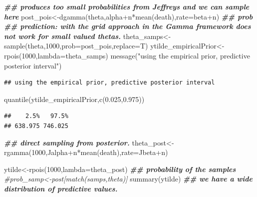\documentclass[
]{book}
\newenvironment{Shaded}{\begin{snugshade}}{\end{snugshade}}
\newcommand{\AttributeTok}[1]{\textcolor[rgb]{0.77,0.63,0.00}{#1}}
\newcommand{\CommentTok}[1]{\textcolor[rgb]{0.56,0.35,0.01}{\textit{#1}}}
\newcommand{\DecValTok}[1]{\textcolor[rgb]{0.00,0.00,0.81}{#1}}
\newcommand{\DocumentationTok}[1]{\textcolor[rgb]{0.56,0.35,0.01}{\textbf{\textit{#1}}}}
\newcommand{\FloatTok}[1]{\textcolor[rgb]{0.00,0.00,0.81}{#1}}
\newcommand{\FunctionTok}[1]{\textcolor[rgb]{0.00,0.00,0.00}{#1}}
\newcommand{\NormalTok}[1]{#1}
\newcommand{\OtherTok}[1]{\textcolor[rgb]{0.56,0.35,0.01}{#1}}
\newcommand{\SpecialCharTok}[1]{\textcolor[rgb]{0.00,0.00,0.00}{#1}}
\newcommand{\StringTok}[1]{\textcolor[rgb]{0.31,0.60,0.02}{#1}}
\theoremstyle{definition}
\theoremstyle{definition}
\theoremstyle{definition}
\theoremstyle{definition}
\theoremstyle{remark}
\begin{document}
\begin{Shaded}
\begin{Highlighting}[]
 \DocumentationTok{\#\# produces too small probabilities from Jeffrey\textquotesingle{}s and we can sample here}
\NormalTok{ post\_pois}\OtherTok{\textless{}{-}}\FunctionTok{dgamma}\NormalTok{(theta,alpha}\SpecialCharTok{+}\NormalTok{n}\SpecialCharTok{*}\FunctionTok{mean}\NormalTok{(death),}\AttributeTok{rate=}\NormalTok{beta}\SpecialCharTok{+}\NormalTok{n) }\DocumentationTok{\#\# prob}
\DocumentationTok{\#\#  prediction:  with the grid approach in the Gamma framework does not work for small valued thetas.}
\NormalTok{ theta\_samps}\OtherTok{\textless{}{-}}\FunctionTok{sample}\NormalTok{(theta,}\DecValTok{1000}\NormalTok{,}\AttributeTok{prob=}\NormalTok{post\_pois,}\AttributeTok{replace=}\NormalTok{T)}
\NormalTok{  ytilde\_empiricalPrior}\OtherTok{\textless{}{-}}\FunctionTok{rpois}\NormalTok{(}\DecValTok{1000}\NormalTok{,}\AttributeTok{lambda=}\NormalTok{theta\_samps)}
  \FunctionTok{message}\NormalTok{(}\StringTok{"using the empirical prior, predictive posterior interval"}\NormalTok{)}
\end{Highlighting}
\end{Shaded}

\begin{verbatim}
## using the empirical prior, predictive posterior interval
\end{verbatim}

\begin{Shaded}
\begin{Highlighting}[]
   \FunctionTok{quantile}\NormalTok{(ytilde\_empiricalPrior,}\FunctionTok{c}\NormalTok{(}\FloatTok{0.025}\NormalTok{,}\FloatTok{0.975}\NormalTok{))}
\end{Highlighting}
\end{Shaded}

\begin{verbatim}
##    2.5%   97.5% 
## 638.975 746.025
\end{verbatim}

\begin{Shaded}
\begin{Highlighting}[]
 \DocumentationTok{\#\# direct sampling from posterior.}
\NormalTok{ theta\_post}\OtherTok{\textless{}{-}}\FunctionTok{rgamma}\NormalTok{(}\DecValTok{1000}\NormalTok{,Jalpha}\SpecialCharTok{+}\NormalTok{n}\SpecialCharTok{*}\FunctionTok{mean}\NormalTok{(death),}\AttributeTok{rate=}\NormalTok{Jbeta}\SpecialCharTok{+}\NormalTok{n)}
 
 
\NormalTok{   ytilde}\OtherTok{\textless{}{-}}\FunctionTok{rpois}\NormalTok{(}\DecValTok{1000}\NormalTok{,}\AttributeTok{lambda=}\NormalTok{theta\_post) }
 \DocumentationTok{\#\# probability of the samples }
 \CommentTok{\#prob\_samp\textless{}{-}post[match(samps,theta)]}
  \FunctionTok{summary}\NormalTok{(ytilde) }\DocumentationTok{\#\# we have a wide distribution of predictive values.}
\end{Highlighting}
\end{Shaded}
\end{document}
